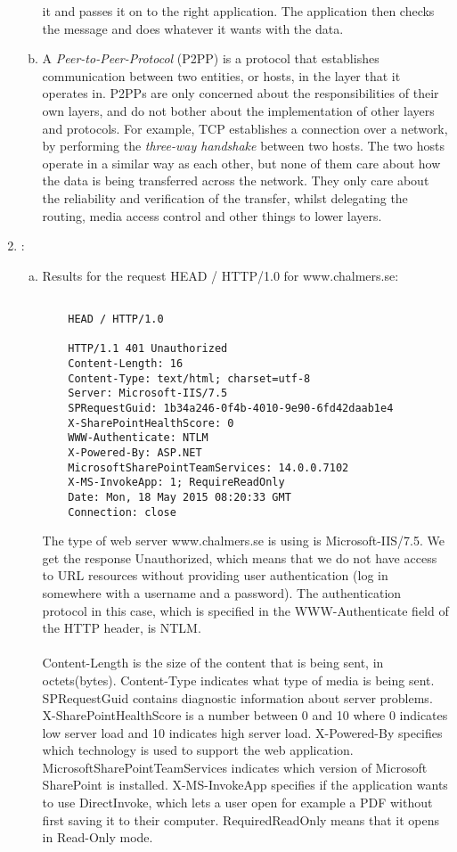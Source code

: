 \documentclass[a4paper,9pt,fleqn]{article}
\begin{document}
\begin{enumerate}[{Task} 1]
\begin{enumerate}[a)]
		it and passes it on to the right application. The application then checks
		the message and does whatever it wants with the data.
		\\
		\item 
		A {\it Peer-to-Peer-Protocol} (P2PP) is a protocol that establishes communication
		between two entities, or hosts, in the layer that it operates in. P2PPs are
		only concerned about the responsibilities of their own layers, and do not bother
		about the implementation of other layers and protocols. For example, TCP
		establishes a connection over a network, by performing the {\it three-way handshake}
		between two hosts. The two hosts operate in a similar way as each other, but none
		of them care about how the data is being transferred across the network. They only
		care about the reliability and verification of the transfer, whilst delegating
		the routing, media access control and other things to lower layers.
	\end{enumerate}

\item :
	\begin{enumerate}[a)]
		\item
		Results for the request HEAD / HTTP/1.0 for www.chalmers.se:

\begin{lstlisting}

	HEAD / HTTP/1.0

	HTTP/1.1 401 Unauthorized
	Content-Length: 16
	Content-Type: text/html; charset=utf-8
	Server: Microsoft-IIS/7.5
	SPRequestGuid: 1b34a246-0f4b-4010-9e90-6fd42daab1e4
	X-SharePointHealthScore: 0
	WWW-Authenticate: NTLM
	X-Powered-By: ASP.NET
	MicrosoftSharePointTeamServices: 14.0.0.7102
	X-MS-InvokeApp: 1; RequireReadOnly
	Date: Mon, 18 May 2015 08:20:33 GMT
	Connection: close
\end{lstlisting}	

		The type of web server {\outp www.chalmers.se} is using is {\outp Microsoft-IIS/7.5}.
		We get the response { Unauthorized}, which means that we do not have access
		to URL resources without providing user authentication (log in somewhere with
		a username and a password). The authentication protocol in this case, which
		is specified in the {\outp WWW-Authenticate} field of the HTTP header, is {\outp NTLM}.
		\\ \\
		Content-Length is the size of the content that is being sent, in octets(bytes).
		Content-Type indicates what type of media is being sent.
		SPRequestGuid contains diagnostic information about server problems.
		X-SharePointHealthScore is a number between 0 and 10 where 0 indicates low server load and 10 indicates high server load.
		X-Powered-By specifies which technology is used to support the web application.
		MicrosoftSharePointTeamServices indicates which version of Microsoft SharePoint is installed.
		X-MS-InvokeApp specifies if the application wants to use DirectInvoke, which lets a user open for example a PDF without first saving it to their computer. 
		RequiredReadOnly means that it opens in Read-Only mode.
		

\end{enumerate}
\end{enumerate}
\end{document}

